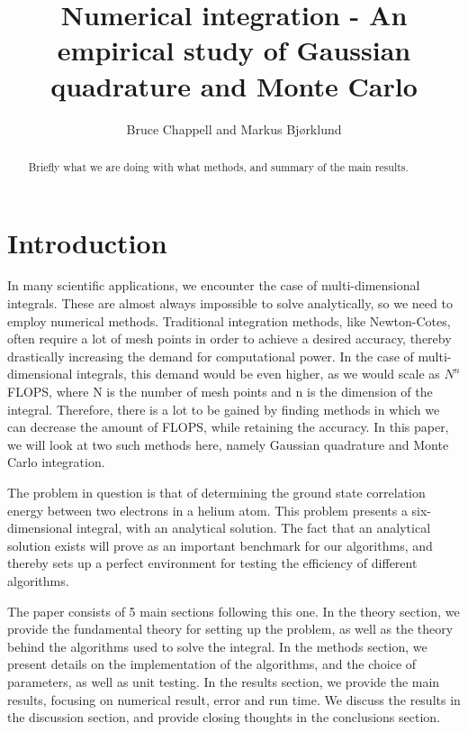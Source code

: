 \documentclass{emulateapj}
\begin{document}
\title{Numerical integration - An empirical study of Gaussian quadrature and Monte Carlo}

\author{Bruce Chappell and Markus Bjørklund}



\begin{abstract}

Briefly what we are doing with what methods, and summary of the main results.

\end{abstract}

\section{Introduction}
\label{sec:introduction}

In many scientific applications, we encounter the case of multi-dimensional integrals. These are almost always impossible to solve analytically, so we need to employ numerical methods. Traditional integration methods, like Newton-Cotes, often require a lot of mesh points in order to achieve a desired accuracy, thereby drastically increasing the demand for computational power. In the case of multi-dimensional integrals, this demand would be even higher, as we would scale as $N^n$ FLOPS, where N is the number of mesh points and n is the dimension of the integral. Therefore, there is a lot to be gained by finding methods in which we can decrease the amount of FLOPS, while retaining the accuracy. In this paper, we will look at two such methods here, namely Gaussian quadrature and Monte Carlo integration.

The problem in question is that of determining the ground state correlation energy between two electrons in a helium atom. This problem presents a six-dimensional integral, with an analytical solution. The fact that an analytical solution exists will prove as an important benchmark for our algorithms, and thereby sets up a perfect environment for testing the efficiency of different algorithms.

The paper consists of 5 main sections following this one. In the theory section, we provide the fundamental theory for setting up the problem, as well as the theory behind the algorithms used to solve the integral. In the methods section, we present details on the implementation of the algorithms, and the choice of parameters, as well as unit testing. In the results section, we provide the main results, focusing on numerical result, error and run time. We discuss the results in the discussion section, and provide closing thoughts in the conclusions section.
\end{document}
